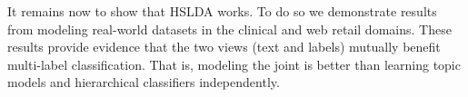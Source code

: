  
It remains now to show that HSLDA works.  To do so we demonstrate results from modeling real-world datasets in the clinical and web
retail domains. These results provide evidence that the two views (text and labels) mutually benefit  multi-label
classification. %
That is, modeling the joint  is better than learning 
topic models and hierarchical classifiers
independently. 
